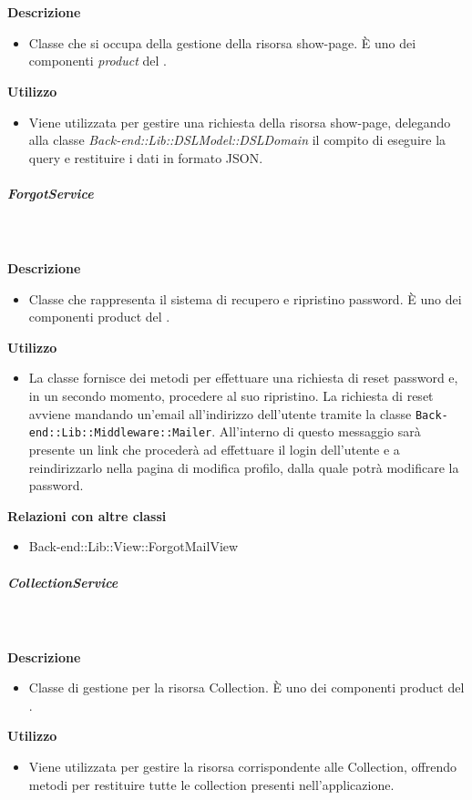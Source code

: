 				\textbf{\\ \\ Descrizione} 
					\begin{itemize}
						\item[] Classe che si occupa della gestione della risorsa show-page. È uno dei componenti \textit{product} del  .
					\end{itemize}      
				\textbf{Utilizzo}  
					\begin{itemize}
						\item[] Viene utilizzata per gestire una richiesta della risorsa show-page, delegando alla classe \textit{Back-end::Lib::DSLModel::DSLDomain} il compito di eseguire la query e restituire i dati in formato JSON.
					\end{itemize}
			\subparagraph{ForgotService}
				
				\textbf{\\ \\ Descrizione} 
					\begin{itemize}
						\item[] Classe che rappresenta il sistema di recupero e ripristino password. È uno dei componenti product del  .
					\end{itemize}      
				\textbf{Utilizzo}  
					\begin{itemize}
						\item[] La classe fornisce dei metodi per effettuare una richiesta di reset password e, in un secondo momento, procedere al suo ripristino. La richiesta di reset avviene mandando un'email all'indirizzo dell'utente tramite la classe \texttt{Back-end::Lib::Middleware::Mailer}. All'interno di questo messaggio sarà presente un link che procederà ad effettuare il login dell'utente e a reindirizzarlo nella pagina di modifica profilo, dalla quale potrà modificare la password.
					\end{itemize}
					\textbf{Relazioni con altre classi}
					\begin{itemize}
							\item{Back-end::Lib::View::ForgotMailView}
					\end{itemize}
			\subparagraph{CollectionService}
				
				\textbf{\\ \\ Descrizione} 
					\begin{itemize}
						\item[] Classe di gestione per la risorsa Collection. È uno dei componenti product del  .
					\end{itemize}      
				\textbf{Utilizzo}  
					\begin{itemize}
						\item[] Viene utilizzata per gestire la risorsa corrispondente alle Collection, offrendo metodi per restituire tutte le collection presenti nell'applicazione.
					\end{itemize}
